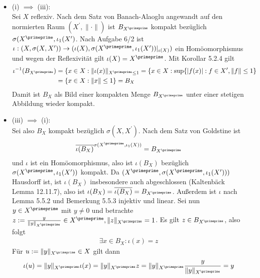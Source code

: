 \begin{solution}
\begin{itemize}
  \item (i) $\implies$ (iii): \\
  Sei $X$ reflexiv. Nach dem Satz von Banach-Alaoglu
  angewandt auf den normierten Raum $(X^{\prime},\|\cdot\|)$ ist $B_{X^{\primeprime}}$
  kompakt bezüglich $\sigma(X^{\primeprime}, \iota_1(X^{\prime})$.
  Nach Aufgabe 6/2 ist $\iota: (X,\sigma(X,X^{\prime})) \to
  (\iota(X),\sigma(X^{\primeprime},\iota_1(X^{\prime}))|_{\iota(X)})$ ein Homöomorphismus
  und wegen der Reflexivität gilt $\iota(X) = X^{\primeprime}$.
  Mit Korollar 5.2.4 gilt
  \begin{align*}
    \iota^{-1}(B_{X^{\primeprime}}) &= \{x \in X: \|\iota(x)\|_{X^{\primeprime} \leq 1}
    = \{x \in X: \sup\{|f(x)|: f \in X^{\prime}, \|f\| \leq 1 \} \\
    &= \{x \in X: \|x\| \leq 1\} = B_X
  \end{align*}
  Damit ist $B_X$ als Bild einer kompakten Menge $B_{X^{\primeprime}}$ unter einer
  stetigen Abbildung wieder kompakt.
  \item (iii) $\implies$ (i): \\
  Sei also $B_X$ kompakt bezüglich $\sigma(X,X^{\prime})$. Nach dem Satz von Goldstine
  ist
  \begin{align*}
    \overline{\iota(B_X)}^{\sigma(X^{\primeprime},\iota_1(X))} = B_{X^{\primeprime}}
  \end{align*}
  und $\iota$ ist ein Homöomorphismus, also ist $\iota(B_X)$ bezüglich
  $\sigma(X^{\primeprime}, \iota_1(X^{\prime}))$ kompakt. Da
  $(X^{\primeprime}, \sigma(X^{\primeprime}, \iota_1(X^{\prime})))$ Hausdorff ist,
  ist $\iota(B_X)$ insbesondere auch abgeschlossen (Kaltenbäck Lemma 12.11.7),
  also ist $\iota(B_X) = \overline{\iota(B_X)} = B_{X^{\primeprime}}$.
  Außerdem ist $\iota$ nach Lemma 5.5.2 und Bemerkung 5.5.3 injektiv und linear.
  Sei nun $y \in X^{\primeprime}$ mit $y \neq 0$ und betrachte
  $z := \frac{y}{\|y\|_{X^{\primeprime}}} \in X^{\primeprime}, \|z\|_{X^{\primeprime}} = 1$.
  Es gilt $z \in B_{X^{\primeprime}}$, also folgt
  \begin{align*}
    \exists x \in B_X: \iota(x) = z
  \end{align*}
  Für $u := \|y\|_{X^{\primeprime}} \in X$ gilt dann
  \begin{align*}
    \iota(u) = \|y\|_{X^{\primeprime}}\iota(x) = \|y\|_{X^{\primeprime}}z
    = \|y\|_{X^{\primeprime}} \frac{y}{\|y\|_{X^{\primeprime}}} = y
  \end{align*}

\end{itemize}
\end{solution}
